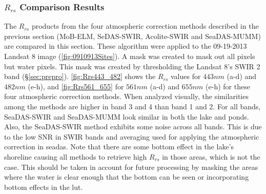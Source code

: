 \subsubsection{\texorpdfstring{$R_{rs}$}{Rrs} Comparison Results}

The $R_{rs}$ products from the four atmospheric correction methods described in the previous section (MoB-ELM, SeDAS-SWIR, Acolite-SWIR and SeaDAS-MUMM) are compared in this section. These algorithm were applied to the 09-19-2013 Landsat 8 image (\autoref{fig:0910913Sites}). A mask was created to mask out all pixels but water pixels. This mask was created by thresholding the Landsat 8's SWIR 2 band (\S\ref{sec:prepro}). \autoref{fig:Rrs443_482} shows the $R_{rs}$ values for $443nm$ (a-d) and $482nm$ (e-h), and \autoref{fig:Rrs561_655} for $561nm$ (a-d) and $655nm$ (e-h) for these four atmospheric correction methods. When analyzed visually, the similarities among the methods are higher in band 3 and 4 than band 1 and 2. For all bands, SeaDAS-SWIR and SeaDAS-MUMM look similar in both the lake and ponds. Also, the SeaDAS-SWIR method exhibits some noise across all bands. This is due to the low SNR in SWIR bands and averaging used for applying the \citet{Gordon:1994} atmospheric correction in \gls{seadas}.  Note that there are some bottom effect in the lake's shoreline causing all methods to retrieve high $R_{rs}$ in those areas, which is not the case. This should be taken in account for future processing by masking the areas where the water is clear enough that the bottom can be seen or incorporating bottom effects in the \gls{lut}.

